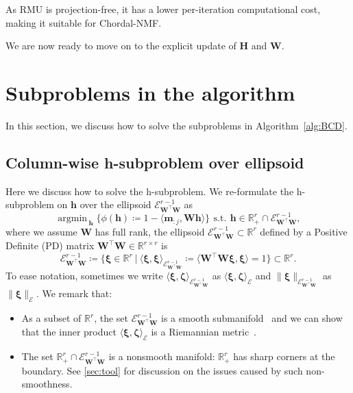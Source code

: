 \documentclass[sn-mathphys-num]{sn-jnl}
\DeclareMathOperator*{\argmin}{\textrm{argmin}\,} %
\def\st              {\,\textrm{s.t.}\,} %
\def\IR  {\mathbb{R}} 	    %
\def\IRr {\IR^{r}} 			%
\def\H {\bm{H}}
\def\W {\bm{W}}
\def\h {\bm{h}}
\def\m {\bm{m}}
\def\cE { \mathcal{E}}
\def\bzeta    {\boldsymbol{\zeta}}
\def\bxi      {\boldsymbol{\xi}}
\begin{document}
As RMU is projection-free, it has a lower per-iteration computational cost, making it suitable for Chordal-NMF.

We are now ready to move on to the explicit update of $\H$ and $\W$.







\section{Subproblems in the algorithm}\label{sec:algo}
In this section, we discuss how to solve the subproblems in Algorithm~\ref{alg:BCD}.

\subsection{Column-wise h-subproblem over ellipsoid}\label{sec:H}
Here we discuss how to solve the h-subproblem.
We re-formulate the h-subproblem on $\h$ over the ellipsoid  $\cE_{\W^\top\W}^{r-1}$ as
\begin{equation}\label{h-manifold-subproblem}
\displaystyle \argmin_{\h}
\Big\{
\phi(\h) 
\coloneqq
1 - \langle\m_{:j}, \W\h\rangle
\Big\}
~\st~
\h \in \IRr_+ \cap \cE_{\W^\top\W}^{r-1},
\tag{h-manifold-subproblem}
\end{equation}
where we assume $\W$ has full rank, the ellipsoid $\cE^{r-1}_{\W^\top\W} \subset \IRr$ defined by a Positive Definite (PD) matrix $\W^\top\W \in \IR^{r\times r}$ is
\begin{equation}\label{def:ellipsoid-h}
\cE_{\W^\top\W}^{r-1}
\coloneqq
\Big\{ 
\bxi \in \IRr ~\big|~ 
\big\langle \bxi ,  \bxi \big\rangle_{\cE_{\W^\top\W}^{r-1}} 
\coloneqq 
\big\langle \W^\top \W  \bxi ,  \bxi \big \rangle = 1
\Big\} 
\subset \IRr.
\tag{Ellipsoid}
\end{equation}
To ease notation, sometimes we write $\langle  \bxi , \bzeta \rangle_{\cE_{\W^\top\W}^{r-1}} $ as $\langle  \bxi , \bzeta \rangle_{\cE} $ 
and $\|  \bxi \|_{\cE_{\W^\top\W}^{r-1}} $ as $\|  \bxi \|_{\cE}$.
We remark that:
\begin{itemize}
    \item As a subset of $\IRr$, the set $\cE_{\W^\top\W}^{r-1}$ is a smooth submanifold~\cite[Def3.10]{boumal2023introduction} and we can show that the inner product $\langle  \bxi , \bzeta \rangle_{\cE} $ is a Riemannian metric~\cite[Prop3.54]{boumal2023introduction}.

    \item The set $\IRr_+ \cap \cE_{\W^\top\W}^{r-1}$ is a nonsmooth manifold: $\IRr_+$ has sharp corners at the boundary. 
    See \textsection\ref{sec:tool} for discussion on the issues caused by such non-smoothness.
\end{itemize}
\end{document}
